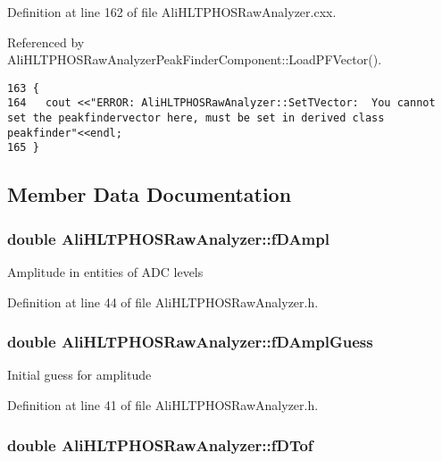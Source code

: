 Definition at line 162 of file Ali\-HLTPHOSRaw\-Analyzer.cxx.

Referenced by Ali\-HLTPHOSRaw\-Analyzer\-Peak\-Finder\-Component::Load\-PFVector().

\footnotesize\begin{verbatim}163 {
164   cout <<"ERROR: AliHLTPHOSRawAnalyzer::SetTVector:  You cannot set the peakfindervector here, must be set in derived class peakfinder"<<endl;
165 }
\end{verbatim}\normalsize 




\subsection{Member Data Documentation}
\subsubsection{\setlength{\rightskip}{0pt plus 5cm}double {\bf Ali\-HLTPHOSRaw\-Analyzer::f\-DAmpl}\hspace{0.3cm}{\tt  [protected]}}\label{classAliHLTPHOSRawAnalyzer_AliHLTPHOSRawAnalyzerPeakFinderp6}


Amplitude in entities of ADC levels 

Definition at line 44 of file Ali\-HLTPHOSRaw\-Analyzer.h.
\subsubsection{\setlength{\rightskip}{0pt plus 5cm}double {\bf Ali\-HLTPHOSRaw\-Analyzer::f\-DAmpl\-Guess}\hspace{0.3cm}{\tt  [protected]}}\label{classAliHLTPHOSRawAnalyzer_AliHLTPHOSRawAnalyzerPeakFinderp3}


Initial guess for amplitude 

Definition at line 41 of file Ali\-HLTPHOSRaw\-Analyzer.h.
\subsubsection{\setlength{\rightskip}{0pt plus 5cm}double {\bf Ali\-HLTPHOSRaw\-Analyzer::f\-DTof}\hspace{0.3cm}{\tt  [protected]}}\label{classAliHLTPHOSRawAnalyzer_AliHLTPHOSRawAnalyzerPeakFinderp5}


